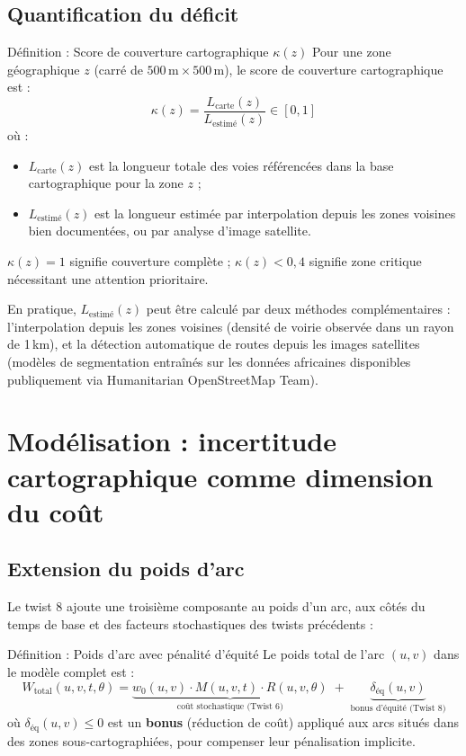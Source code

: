 \documentclass[12pt,a4paper]{article}
\theoremstyle{definition}
\theoremstyle{remark}
\begin{document}
\subsection{Quantification du déficit}

\begin{defbox}{Définition : Score de couverture cartographique $\kappa(z)$}
Pour une zone géographique $z$ (carré de $500\,\text{m} \times 500\,\text{m}$),
le score de couverture cartographique est :
\[
  \kappa(z) = \frac{L_\text{carte}(z)}{L_\text{estimé}(z)} \in [0, 1]
\]
où :
\begin{itemize}[leftmargin=1.5em]
  \item $L_\text{carte}(z)$ est la longueur totale des voies référencées
    dans la base cartographique pour la zone $z$ ;
  \item $L_\text{estimé}(z)$ est la longueur estimée par interpolation
    depuis les zones voisines bien documentées, ou par analyse d'image
    satellite.
\end{itemize}
$\kappa(z) = 1$ signifie couverture complète ; $\kappa(z) < 0{,}4$
signifie zone critique nécessitant une attention prioritaire.
\end{defbox}

En pratique, $L_\text{estimé}(z)$ peut être calculé par deux méthodes
complémentaires : l'interpolation depuis les zones voisines (densité
de voirie observée dans un rayon de 1\,km), et la détection automatique
de routes depuis les images satellites (modèles de segmentation entraînés
sur les données africaines disponibles publiquement via Humanitarian
OpenStreetMap Team).

\newpage

\section{Modélisation : incertitude cartographique comme dimension du coût}

\subsection{Extension du poids d'arc}

Le twist 8 ajoute une troisième composante au poids d'un arc,
aux côtés du temps de base et des facteurs stochastiques des
twists précédents :

\begin{defbox}{Définition : Poids d'arc avec pénalité d'équité}
Le poids total de l'arc $(u, v)$ dans le modèle complet est :
\[
  W_\text{total}(u,v,t,\theta) =
    \underbrace{w_0(u,v) \cdot M(u,v,t) \cdot R(u,v,\theta)}_{\text{coût stochastique (Twist 6)}}
    \;+\;
    \underbrace{\delta_\text{éq}(u,v)}_{\text{bonus d'équité (Twist 8)}}
\]
où $\delta_\text{éq}(u,v) \leq 0$ est un \textbf{bonus} (réduction de coût)
appliqué aux arcs situés dans des zones sous-cartographiées, pour
compenser leur pénalisation implicite.
\end{defbox}
\end{document}
